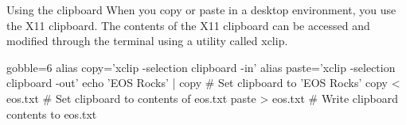 \begin{block}{Using the clipboard}
  When you copy or paste in a desktop environment, you use the X11 clipboard. The contents of the X11 clipboard can be accessed and modified through the terminal using a utility called xclip.
  \begin{indented}
    \begin{bashcode*}{gobble=6}
      alias copy='xclip -selection clipboard -in'
      alias paste='xclip -selection clipboard -out'
      echo 'EOS Rocks' | copy # Set clipboard to 'EOS Rocks'
      copy < eos.txt          # Set clipboard to contents of eos.txt
      paste > eos.txt         # Write clipboard contents to eos.txt
    \end{bashcode*}
  \end{indented}
\end{block}
